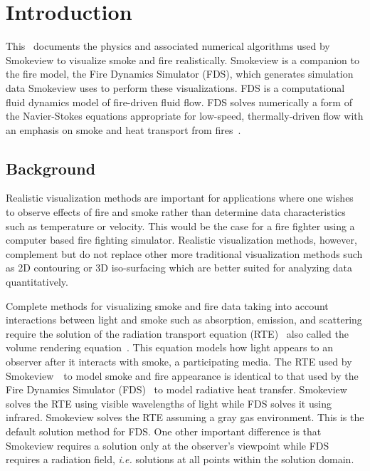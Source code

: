 %
%

\section{Introduction}
This \paper\ documents the physics and associated numerical algorithms used by Smokeview\cite{Smokeview_Users_Guide} to visualize smoke and fire realistically.  Smokeview is a companion to the fire model, the Fire Dynamics Simulator (FDS), which generates   simulation data Smokeview uses to perform these visualizations. FDS is a computational fluid dynamics model of fire-driven fluid flow. FDS solves numerically a form of the Navier-Stokes equations appropriate for low-speed, thermally-driven flow with an emphasis on smoke and heat transport from fires~\cite{FDS_Tech_Guide}.

\subsection{Background}

Realistic visualization methods are important for applications where one wishes to observe effects of fire and smoke rather than determine data characteristics such as temperature or velocity.  This would be the case for a fire fighter using a computer based fire fighting simulator. Realistic visualization methods, however, complement but do not replace other more traditional visualization methods such as 2D contouring or 3D iso-surfacing which are better suited for analyzing data quantitatively.

Complete methods for visualizing smoke and fire data taking into account interactions between light and smoke such as absorption, emission, and scattering require the solution of the radiation transport equation (RTE)~\cite{Siegel:2001} also called the volume rendering equation~\cite{levoy:1988}. This equation models how light appears to an observer after it interacts with smoke, a participating media. The RTE used by Smokeview~\citesmv\ to model smoke and fire appearance is identical to that used by the Fire Dynamics Simulator (FDS)~\cite{FDS_Tech_Guide} to model radiative heat transfer.  Smokeview solves the RTE using visible wavelengths of light while FDS solves it using infrared. Smokeview solves the RTE assuming a gray gas environment.  This is the default solution method for FDS.  One other important difference is that Smokeview requires a solution only at the observer's viewpoint while FDS requires a radiation field, {\em i.e.} solutions at all points within the solution domain.

